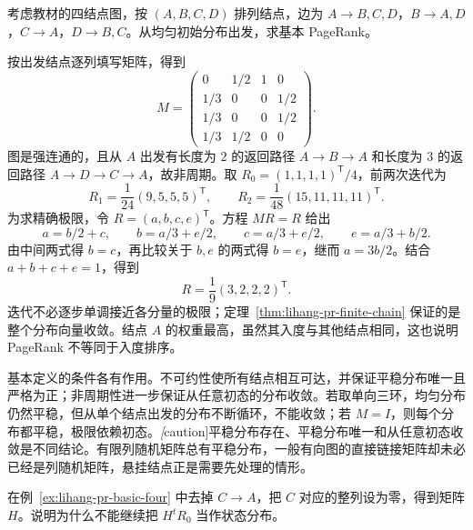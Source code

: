 \begin{example}
\label{ex:lihang-pr-basic-four}
考虑教材的四结点图，按 $(A,B,C,D)$ 排列结点，边为 $A\to B,C,D$，$B\to A,D$，$C\to A$，$D\to B,C$。从均匀初始分布出发，求基本 PageRank。
\end{example}

\begin{solve}
按出发结点逐列填写矩阵，得到
\begin{equation}
\label{eq:lihang-pr-four-matrix}
    M=\begin{pmatrix}
        0&1/2&1&0\\
        1/3&0&0&1/2\\
        1/3&0&0&1/2\\
        1/3&1/2&0&0
    \end{pmatrix}.
\end{equation}
图是强连通的，且从 $A$ 出发有长度为 $2$ 的返回路径 $A\to B\to A$ 和长度为 $3$ 的返回路径 $A\to D\to C\to A$，故非周期。取 $R_0=(1,1,1,1)^{\mathsf T}/4$，前两次迭代为
\[
    R_1=\frac1{24}(9,5,5,5)^{\mathsf T},\qquad
    R_2=\frac1{48}(15,11,11,11)^{\mathsf T}.
\]
为求精确极限，令 $R=(a,b,c,e)^{\mathsf T}$。方程 $MR=R$ 给出
\[
    a=b/2+c,\qquad b=a/3+e/2,\qquad
    c=a/3+e/2,\qquad e=a/3+b/2.
\]
由中间两式得 $b=c$，再比较关于 $b,e$ 的两式得 $b=e$，继而 $a=3b/2$。结合 $a+b+c+e=1$，得到
\begin{equation}
\label{eq:lihang-pr-four-basic-result}
    R=\frac19(3,2,2,2)^{\mathsf T}.
\end{equation}
迭代不必逐步单调接近各分量的极限；定理~\ref{thm:lihang-pr-finite-chain} 保证的是整个分布向量收敛。结点 $A$ 的权重最高，虽然其入度与其他结点相同，这也说明 PageRank 不等同于入度排序。
\end{solve}

基本定义的条件各有作用。不可约性使所有结点相互可达，并保证平稳分布唯一且严格为正；非周期性进一步保证从任意初态的分布收敛。若取单向三环，均匀分布仍然平稳，但从单个结点出发的分布不断循环，不能收敛；若 $M=I$，则每个分布都平稳，极限依赖初态。\emph[caution]{平稳分布存在、平稳分布唯一和从任意初态收敛是不同结论}。有限列随机矩阵总有平稳分布，一般有向图的直接链接矩阵却未必已经是列随机矩阵，悬挂结点正是需要先处理的情形。

\begin{example}
\label{ex:lihang-pr-dangling-loss}
在例~\ref{ex:lihang-pr-basic-four} 中去掉 $C\to A$，把 $C$ 对应的整列设为零，得到矩阵 $H$。说明为什么不能继续把 $H^tR_0$ 当作状态分布。
\end{example}

